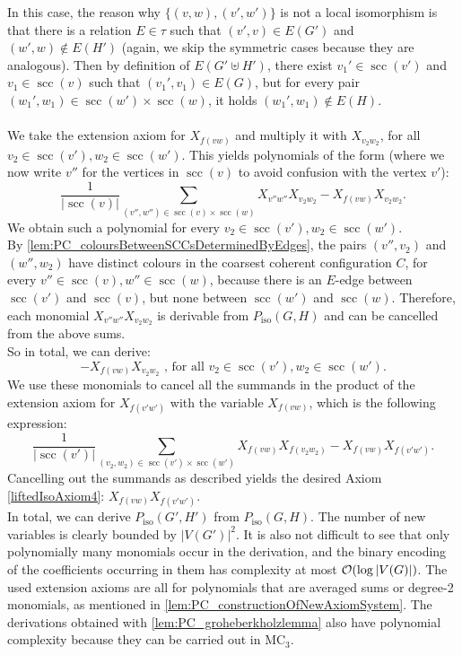 \documentclass[10pt,a4paper]{article}
\newcommand{\MC}{\textrm{MC}}
\newcommand{\Oo}{{\cal O}}
\newcommand{\scc}{{\operatorname{scc}}}
\newcommand{\Piso}{P_{\text{iso}}}
\begin{document}
In this case, the reason why $\{(v,w),(v',w')\}$ is not a local isomorphism is that there is a relation $E \in \tau$ such that $(v',v) \in E(G')$ and $(w',w) \notin E(H')$ (again, we skip the symmetric cases because they are analogous). Then by definition of $E(G' \uplus H')$, there exist $v_1' \in \scc(v')$ and $v_1 \in \scc(v)$ such that $(v_1',v_1) \in E(G)$, but for every pair $(w_1',w_1) \in \scc(w') \times \scc(w)$, it holds $(w_1',w_1) \notin E(H)$.\\
\\
We take the extension axiom for $X_{f(vw)}$ and multiply it with $X_{v_2w_2}$, for all $v_2 \in \scc(v'), w_2 \in \scc(w')$. This yields polynomials of the form (where we now write $v''$ for the vertices in $\scc(v)$ to avoid confusion with the vertex $v'$):
\[
\frac{1}{|\scc(v)|}\sum\limits_{(v'',w'') \in \scc(v) \times \scc(w)} X_{v''w''}X_{v_2w_2} - X_{f(vw)}X_{v_2w_2}. 
\]
We obtain such a polynomial for every $v_2 \in \scc(v'), w_2 \in \scc(w')$.\\
By \autoref{lem:PC_coloursBetweenSCCsDeterminedByEdges}, the pairs $(v'',v_2)$ and $(w'',w_2)$ have distinct colours in the coarsest coherent configuration $C$, for every $v'' \in \scc(v), w'' \in \scc(w)$, because there is an $E$-edge between $\scc(v')$ and $\scc(v)$, but none between $\scc(w')$ and $\scc(w)$. Therefore, each monomial $X_{v''w''}X_{v_2w_2}$ is derivable from $\Piso(G,H)$ and can be cancelled from the above sums.\\
So in total, we can derive: 
\[
- X_{f(vw)}X_{v_2w_2} \text{ , for all } v_2 \in \scc(v'), w_2 \in \scc(w').
\]
We use these monomials to cancel all the summands in the product of the extension axiom for $X_{f(v'w')}$ with the variable $X_{f(vw)}$, which is the following expression:
\[
\frac{1}{|\scc(v')|}\sum\limits_{(v_2,w_2) \in \scc(v') \times \scc(w')} X_{f(vw)}X_{f(v_2w_2)} - X_{f(vw)}X_{f(v'w')}.
\]
Cancelling out the summands as described yields the desired Axiom \eqref{liftedIsoAxiom4}: $X_{f(vw)}X_{f(v'w')}$.\\
	
In total, we can derive $\Piso(G',H')$ from $\Piso(G,H)$. The number of new variables is clearly bounded by $|V(G')|^2$. It is also not difficult to see that only polynomially many monomials occur in the derivation, and the binary encoding of the coefficients occurring in them has complexity at most $\Oo(\log |V(G)|)$. The used extension axioms are all for polynomials that are averaged sums or degree-2 monomials, as mentioned in \autoref{lem:PC_constructionOfNewAxiomSystem}.
The derivations obtained with \autoref{lem:PC_groheberkholzlemma} also have polynomial complexity because they can be carried out in $\MC_3$.
	
\end{document}
